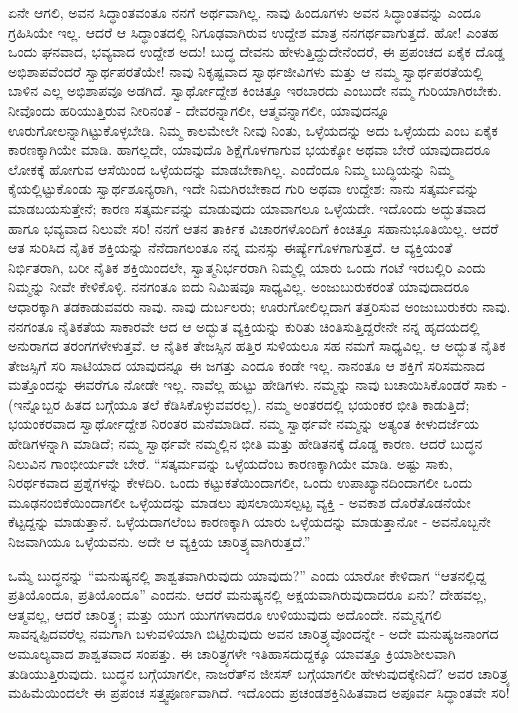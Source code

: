 ಏನೇ ಆಗಲಿ, ಅವನ ಸಿದ್ಧಾಂತವಂತೂ ನನಗೆ ಅರ್ಥವಾಗಿಲ್ಲ. ನಾವು ಹಿಂದೂಗಳು ಅವನ ಸಿದ್ಧಾಂತವನ್ನು ಎಂದೂ ಗ್ರಹಿಸಿಯೇ ಇಲ್ಲ. ಆದರೆ ಆ ಸಿದ್ಧಾಂತದಲ್ಲಿ ನಿಗೂಢವಾಗಿರುವ ಉದ್ದೇಶ ಮಾತ್ರ ನನಗರ್ಥವಾಗುತ್ತದೆ. ಹೋ! ಎಂತಹ ಒಂದು ಘನವಾದ, ಭವ್ಯವಾದ ಉದ್ದೇಶ ಅದು! ಬುದ್ಧ ದೇವನು ಹೇಳುತ್ತಿದ್ದುದೇನೆಂದರೆ, ಈ ಪ್ರಪಂಚದ ಏಕೈಕ ದೊಡ್ಡ ಅಭಿಶಾಪವೆಂದರೆ ಸ್ವಾರ್ಥಪರತೆಯೇ! ನಾವು ನಿಕೃಷ್ಟವಾದ ಸ್ವಾರ್ಥಜೀವಿಗಳು ಮತ್ತು ಆ ನಮ್ಮ ಸ್ವಾರ್ಥಪರತೆಯಲ್ಲಿ ಬಾಳಿನ ಎಲ್ಲ ಅಭಿಶಾಪವೂ ಅಡಗಿದೆ. ಸ್ವಾರ್ಥೋದ್ದೇಶ ಕಿಂಚಿತ್ತೂ ಇರಬಾರದು ಎಂಬುದೇ ನಮ್ಮ ಗುರಿಯಾಗಿರಬೇಕು. ನೀವೊಂದು ಹರಿಯುತ್ತಿರುವ ನೀರಿನಂತೆ - ದೇವರನ್ನಾಗಲೀ, ಆತ್ಮವನ್ನಾಗಲೀ, ಯಾವುದನ್ನೂ ಊರುಗೋಲನ್ನಾಗಿಟ್ಟುಕೊಳ್ಳಬೇಡಿ. ನಿಮ್ಮ ಕಾಲಮೇಲೇ ನೀವು ನಿಂತು, ಒಳ್ಳೆಯದನ್ನು ಅದು ಒಳ್ಳೆಯದು ಎಂಬ ಏಕೈಕ ಕಾರಣಕ್ಕಾಗಿಯೇ ಮಾಡಿ. ಹಾಗಲ್ಲದೇ, ಯಾವುದೊ ಶಿಕ್ಷೆಗೊಳಗಾಗುವ ಭಯಕ್ಕೋ ಅಥವಾ ಬೇರೆ ಯಾವುದಾದರೂ ಲೋಕಕ್ಕೆ ಹೋಗುವ ಆಸೆಯಿಂದ ಒಳ್ಳೆಯದನ್ನು ಮಾಡಬೇಕಾಗಿಲ್ಲ. ಎಂದೆಂದೂ ನಿಮ್ಮ ಬುದ್ಧಿಯನ್ನು ನಿಮ್ಮ ಕೈಯಲ್ಲಿಟ್ಟುಕೊಂಡು ಸ್ವಾರ್ಥಶೂನ್ಯರಾಗಿ, ಇದೇ ನಿಮಗಿರಬೇಕಾದ ಗುರಿ ಅಥವಾ ಉದ್ದೇಶ: ನಾನು ಸತ್ಕರ್ಮವನ್ನು ಮಾಡಬಯಸುತ್ತೇನೆ; ಕಾರಣ ಸತ್ಕರ್ಮವನ್ನು ಮಾಡುವುದು ಯಾವಾಗಲೂ ಒಳ್ಳೆಯದೇ. ಇದೊಂದು ಅದ್ಭುತವಾದ ಹಾಗೂ ಭವ್ಯವಾದ ನಿಲುವೇ ಸರಿ! ನನಗೆ ಆತನ ತಾರ್ಕಿಕ ವಿಚಾರಗಳೊಂದಿಗೆ ಕಿಂಚಿತ್ತೂ ಸಹಾನುಭೂತಿಯಿಲ್ಲ. ಆದರೆ ಆತ ಸುರಿಸಿದ ನೈತಿಕ ಶಕ್ತಿಯನ್ನು ನೆನೆದಾಗಲಂತೂ ನನ್ನ ಮನಸ್ಸು ಈರ್ಷ್ಯೆಗೊಳಗಾಗುತ್ತದೆ. ಆ ವ್ಯಕ್ತಿಯಂತೆ ನಿರ್ಭಿತರಾಗಿ, ಬರೀ ನೈತಿಕ ಶಕ್ತಿಯಿಂದಲೇ, ಸ್ವಾತ್ಮನಿರ್ಭರರಾಗಿ ನಿಮ್ಮಲ್ಲಿ ಯಾರು ಒಂದು ಗಂಟೆ ಇರಬಲ್ಲಿರಿ ಎಂದು ನಿಮ್ಮನ್ನು ನೀವೇ ಕೇಳಿಕೊಳ್ಳಿ. ನನಗಂತೂ ಐದು ನಿಮಿಷವೂ ಸಾಧ್ಯವಿಲ್ಲ. ಅಂಜುಬುರುಕರಂತೆ ಯಾವುದಾದರೂ ಆಧಾರಕ್ಕಾಗಿ ತಡಕಾಡುವವರು ನಾವು. ನಾವು ದುರ್ಬಲರು; ಊರುಗೋಲಿಲ್ಲದಾಗ ತತ್ತರಿಸುವ ಅಂಜುಬುರುಕರು ನಾವು. ನನಗಂತೂ ನೈತಿಕತೆಯ ಸಾಕಾರವೇ ಆದ ಆ ಅದ್ಭುತ ವ್ಯಕ್ತಿಯನ್ನು ಕುರಿತು ಚಿಂತಿಸುತ್ತಿದ್ದರೇನೇ ನನ್ನ ಹೃದಯದಲ್ಲಿ ಅನುರಾಗದ ತರಂಗಗಳೇಳುತ್ತವೆ. ಆ ನೈತಿಕ ತೇಜಸ್ಸಿನ ಹತ್ತಿರ ಸುಳಿಯಲೂ ಸಹ ನಮಗೆ ಸಾಧ್ಯವಿಲ್ಲ. ಆ ಅದ್ಭುತ ನೈತಿಕ ತೇಜಸ್ಸಿಗೆ ಸರಿ ಸಾಟಿಯಾದ ಯಾವುದನ್ನೂ ಈ ಜಗತ್ತು ಎಂದೂ ಕಂಡೇ ಇಲ್ಲ. ನಾನಂತೂ ಆ ಶಕ್ತಿಗೆ ಸರಿಸಮನಾದ ಮತ್ತೊಂದನ್ನು ಈವರೆಗೂ ನೋಡೇ ಇಲ್ಲ. ನಾವೆಲ್ಲ ಹುಟ್ಟು ಹೇಡಿಗಳು. ನಮ್ಮನ್ನು ನಾವು ಬಚಾಯಿಸಿಕೊಂಡರೆ ಸಾಕು - (ಇನ್ನೊಬ್ಬರ ಹಿತದ ಬಗ್ಗೆಯೂ ತಲೆ ಕೆಡಿಸಿಕೊಳ್ಳುವವರಲ್ಲ). ನಮ್ಮ ಅಂತರದಲ್ಲಿ ಭಯಂಕರ ಭೀತಿ ಕಾಡುತ್ತಿದೆ; ಭಯಂಕರವಾದ ಸ್ವಾರ್ಥೋದ್ದೇಶ ನಿರಂತರ ಮನೆಮಾಡಿದೆ. ನಮ್ಮ ಸ್ವಾರ್ಥವೇ ನಮ್ಮನ್ನು ಅತ್ಯಂತ ಕೀಳುದರ್ಜೆಯ ಹೇಡಿಗಳನ್ನಾಗಿ ಮಾಡಿದೆ; ನಮ್ಮ ಸ್ವಾರ್ಥವೇ ನಮ್ಮಲ್ಲಿನ ಭೀತಿ ಮತ್ತು ಹೇಡಿತನಕ್ಕೆ ದೊಡ್ಡ ಕಾರಣ. ಆದರೆ ಬುದ್ಧನ ನಿಲುವಿನ ಗಾಂಭೀರ್ಯವೇ ಬೇರೆ. “ಸತ್ಕರ್ಮವನ್ನು ಒಳ್ಳೆಯದೆಂಬ ಕಾರಣಕ್ಕಾಗಿಯೇ ಮಾಡಿ. ಅಷ್ಟು ಸಾಕು, ನಿರರ್ಥಕವಾದ ಪ್ರಶ್ನೆಗಳನ್ನು ಕೇಳದಿರಿ. ಒಂದು ಕಟ್ಟುಕತೆಯಿಂದಾಗಲೀ, ಒಂದು ಉಪಾಖ್ಯಾನದಿಂದಾಗಲೀ ಒಂದು ಮೂಢನಂಬಿಕೆಯಿಂದಾಗಲೀ ಒಳ್ಳೆಯದನ್ನು ಮಾಡಲು ಪುಸಲಾಯಿಸಲ್ಪಟ್ಟ ವ್ಯಕ್ತಿ - ಅವಕಾಶ ದೊರೆತೊಡನೆಯೇ ಕೆಟ್ಟದ್ದನ್ನು ಮಾಡುತ್ತಾನೆ. ಒಳ್ಳೆಯದಾಗಲೆಂಬ ಕಾರಣಕ್ಕಾಗಿ ಯಾರು ಒಳ್ಳೆಯದನ್ನು ಮಾಡುತ್ತಾನೋ - ಅವನೊಬ್ಬನೇ ನಿಜವಾಗಿಯೂ ಒಳ್ಳೆಯವನು. ಅದೇ ಆ ವ್ಯಕ್ತಿಯ ಚಾರಿತ್ರ್ಯವಾಗಿರುತ್ತದೆ.”

ಒಮ್ಮೆ ಬುದ್ಧನನ್ನು “ಮನುಷ್ಯನಲ್ಲಿ ಶಾಶ್ವತವಾಗಿರುವುದು ಯಾವುದು?” ಎಂದು ಯಾರೋ ಕೇಳಿದಾಗ “ಆತನಲ್ಲಿದ್ದ ಪ್ರತಿಯೊಂದೂ, ಪ್ರತಿಯೊಂದೂ” ಎಂದನು. ಆದರೆ ಮನುಷ್ಯನಲ್ಲಿ ಅಕ್ಷಯವಾಗಿರುವುದಾದರೂ ಏನು? ದೇಹವಲ್ಲ, ಆತ್ಮವಲ್ಲ, ಆದರೆ ಚಾರಿತ್ರ್ಯ; ಮತ್ತು ಯುಗ ಯುಗಗಳಾದರೂ ಉಳಿಯುವುದು ಅದೊಂದೇ. ನಮ್ಮನ್ನಗಲಿ ಸಾವನ್ನಪ್ಪಿದವರೆಲ್ಲ ನಮಗಾಗಿ ಬಳುವಳಿಯಾಗಿ ಬಿಟ್ಟಿರುವುದು ಅವನ ಚಾರಿತ್ರ್ಯವೊಂದನ್ನೇ - ಅದೇ ಮನುಷ್ಯಜನಾಂಗದ ಅಮೂಲ್ಯವಾದ ಶಾಶ್ವತವಾದ ಸಂಪತ್ತು. ಈ ಚಾರಿತ್ರ್ಯಗಳೇ ಇತಿಹಾಸದುದ್ದಕ್ಕೂ ಯಾವತ್ತೂ ಕ್ರಿಯಾಶೀಲವಾಗಿ ತುಡಿಯುತ್ತಿರುವುದು. ಬುದ್ಧನ ಬಗ್ಗೆಯಾಗಲೀ, ನಾಜರೆತ್‌ನ ಜೀಸಸ್ ಬಗ್ಗೆಯಾಗಲೀ ಹೇಳುವುದಕ್ಕೇನಿದೆ? ಅವರ ಚಾರಿತ್ರ್ಯ ಮಹಿಮೆಯಿಂದಲೇ ಈ ಪ್ರಪಂಚ ಸತ್ತ್ವಪೂರ್ಣವಾಗಿದೆ. ಇದೊಂದು ಪ್ರಚಂಡಶಕ್ತಿನಿಹಿತವಾದ ಅಪೂರ್ವ ಸಿದ್ಧಾಂತವೇ ಸರಿ!

